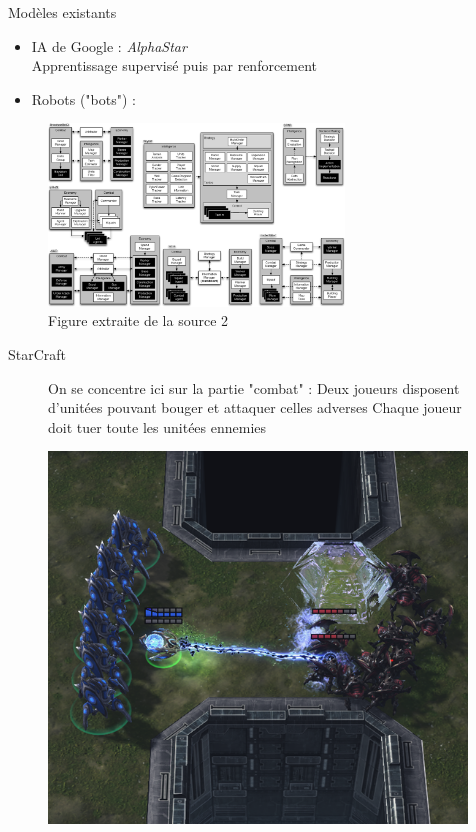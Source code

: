 \documentclass[french]{beamer}
\begin{document}
\begin{frame}{Modèles existants}
	\begin{itemize}
		\item IA de Google : \textit{AlphaStar} 
			\\Apprentissage supervisé puis par renforcement
		\item Robots ("bots") :
	\end{itemize}
\begin{figure}
	\centering
	\includegraphics[width=0.7\textwidth]{architectures.png}
	\caption{Figure extraite de la source 2}
\end{figure}
	
\end{frame}
\begin{frame}{StarCraft}
\begin{figure}
	\centering
	\begin{minipage}{0.45\textwidth}
		On se concentre ici sur la partie "combat" :
		\vspace{0.3cm}
		Deux joueurs disposent d'unitées pouvant bouger et attaquer celles adverses
		\vspace{0.3cm}
		Chaque joueur doit tuer toute les unitées ennemies
	\end{minipage}\hfill
	\begin{minipage}{0.5\textwidth}
		\centering
		\includegraphics[width=0.99\textwidth]{screen_starcraft_combat.png}
	\end{minipage}
\end{figure}
\end{frame}
\end{document}
